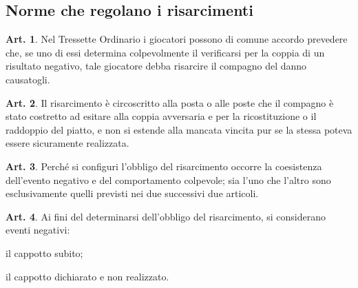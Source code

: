\documentclass[italian,a4paper]{article}
\theoremstyle{definition}
\newtheorem{art}{Art.}
\begin{document}
\subsection{Norme che regolano i risarcimenti}
\begin{art}
Nel Tressette Ordinario i giocatori possono di comune accordo prevedere che, se uno di essi determina colpevolmente il verificarsi per la coppia di un risultato negativo, tale giocatore debba risarcire il compagno del danno causatogli.
\end{art}
\begin{art}
Il risarcimento è circoscritto alla posta o alle poste che il compagno è stato costretto ad esitare alla coppia avversaria e per la ricostituzione o il raddoppio del piatto, e non si estende alla mancata vincita pur se la stessa poteva essere sicuramente realizzata.
\end{art}
\begin{art}
Perché si configuri l'obbligo del risarcimento occorre la coesistenza dell'evento negativo e del comportamento colpevole; sia l'uno che l'altro sono esclusivamente quelli previsti nei due successivi due articoli.
\end{art}
\begin{art}
Ai fini del determinarsi dell'obbligo del risarcimento, si considerano eventi negativi:
\item  il cappotto subito;
\item  il cappotto dichiarato e non realizzato.
\end{art}
\end{document}
